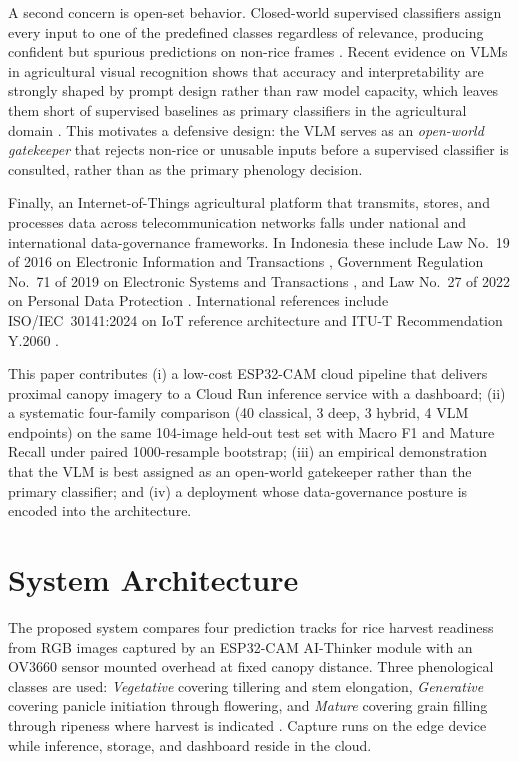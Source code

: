 \documentclass[conference]{IEEEtran}
\begin{document}
A second concern is open-set behavior. Closed-world supervised classifiers assign every input to one of the predefined classes regardless of relevance, producing confident but spurious predictions on non-rice frames \cite{b_geng}. Recent evidence on VLMs in agricultural visual recognition shows that accuracy and interpretability are strongly shaped by prompt design rather than raw model capacity, which leaves them short of supervised baselines as primary classifiers in the agricultural domain \cite{b_weedvlm}. This motivates a defensive design: the VLM serves as an \textit{open-world gatekeeper} that rejects non-rice or unusable inputs before a supervised classifier is consulted, rather than as the primary phenology decision.

Finally, an Internet-of-Things agricultural platform that transmits, stores, and processes data across telecommunication networks falls under national and international data-governance frameworks. In Indonesia these include Law No.~19 of 2016 on Electronic Information and Transactions \cite{b_uuite}, Government Regulation No.~71 of 2019 on Electronic Systems and Transactions \cite{b_pp71}, and Law No.~27 of 2022 on Personal Data Protection \cite{b_pdp}. International references include ISO/IEC~30141:2024 on IoT reference architecture \cite{b_iso30141} and ITU-T Recommendation Y.2060 \cite{b_y2060}.

This paper contributes (i) a low-cost ESP32-CAM cloud pipeline that delivers proximal canopy imagery to a Cloud Run inference service with a dashboard; (ii) a systematic four-family comparison (40 classical, 3 deep, 3 hybrid, 4 VLM endpoints) on the same 104-image held-out test set with Macro F1 and Mature Recall under paired 1000-resample bootstrap; (iii) an empirical demonstration that the VLM is best assigned as an open-world gatekeeper rather than the primary classifier; and (iv) a deployment whose data-governance posture is encoded into the architecture.

\section{System Architecture}
The proposed system compares four prediction tracks for rice harvest readiness from RGB images captured by an ESP32-CAM AI-Thinker module with an OV3660 sensor mounted overhead at fixed canopy distance. Three phenological classes are used: \textit{Vegetative} covering tillering and stem elongation, \textit{Generative} covering panicle initiation through flowering, and \textit{Mature} covering grain filling through ripeness where harvest is indicated \cite{b_qin}. Capture runs on the edge device while inference, storage, and dashboard reside in the cloud.
\end{document}

